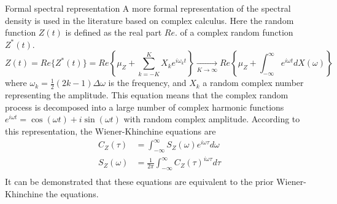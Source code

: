 \documentclass[8pt]{beamer}
\renewcommand{\emph}[1]{\textcolor{myorange}{#1}}
\begin{document}
\begin{frame}{Formal spectral representation}
    A more formal representation of the \emph{spectral density} is used in the literature based on \emph{complex calculus}. Here the random function $Z(t)$ is defined as the \emph{real part $Re{.}$}   of a \emph{complex random function} $Z^* (t)$.   
\[
    Z(t) = Re\{Z^* (t)\} = Re \left\{ \mu_Z + \sum_{k=-K}^{K} X_k e^{i\omega_k t} \right\} \xrightarrow[K \rightarrow \infty]{} Re\left\{ \mu_Z + \int_{-\infty}^{\infty} e^{i\omega t} dX (\omega) \right\} 
\]
where $\omega_k = \frac{1}{2} (2k-1) \Delta \omega$ is the frequency, and $X_k$ a \emph{random complex number} representing the \emph{amplitude}.  This equation means that the \emph{complex random process} is decomposed into a large number of complex harmonic functions $e^{i\omega t} = \cos(\omega t) + i\sin(\omega t)$ with  \emph{random complex amplitude}. According to this representation, the \emph{Wiener-Khinchine} equations are
    \begin{align*}
        C_Z (\tau) &= \int_{-\infty}^{\infty} S_Z(\omega) e^{i\omega \tau}  d\omega \\
        S_Z (\omega) &= \frac{1}{2\pi} \int_{-\infty}^{\infty} C_Z(\tau)^{i\omega \tau} d\tau \\
    \end{align*}
    It can be demonstrated that these equations are equivalent to the prior \emph{Wiener-Khinchine} the equations. 
\end{frame}
\end{document}
